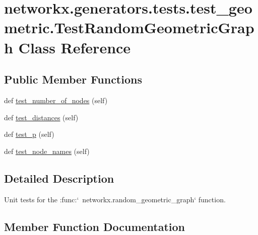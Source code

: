 \hypertarget{classnetworkx_1_1generators_1_1tests_1_1test__geometric_1_1TestRandomGeometricGraph}{}\section{networkx.\+generators.\+tests.\+test\+\_\+geometric.\+Test\+Random\+Geometric\+Graph Class Reference}
\label{classnetworkx_1_1generators_1_1tests_1_1test__geometric_1_1TestRandomGeometricGraph}
\subsection*{Public Member Functions}
\begin{DoxyCompactItemize}
\item 
def \hyperlink{classnetworkx_1_1generators_1_1tests_1_1test__geometric_1_1TestRandomGeometricGraph_a9e9b4da2e75cdfedb6fe068219b51c44}{test\+\_\+number\+\_\+of\+\_\+nodes} (self)
\item 
def \hyperlink{classnetworkx_1_1generators_1_1tests_1_1test__geometric_1_1TestRandomGeometricGraph_a646b7353b754513fc50a2a8a4eea93cc}{test\+\_\+distances} (self)
\item 
def \hyperlink{classnetworkx_1_1generators_1_1tests_1_1test__geometric_1_1TestRandomGeometricGraph_a17479c86622c65ce44e7ac25d511a8f6}{test\+\_\+p} (self)
\item 
def \hyperlink{classnetworkx_1_1generators_1_1tests_1_1test__geometric_1_1TestRandomGeometricGraph_a3046f4865792fb7b8aff50625944e399}{test\+\_\+node\+\_\+names} (self)
\end{DoxyCompactItemize}


\subsection{Detailed Description}
\begin{DoxyVerb}Unit tests for the :func:`~networkx.random_geometric_graph`
function.\end{DoxyVerb}
 

\subsection{Member Function Documentation}
\mbox{\label{classnetworkx_1_1generators_1_1tests_1_1test__geometric_1_1TestRandomGeometricGraph_a646b7353b754513fc50a2a8a4eea93cc}} 
